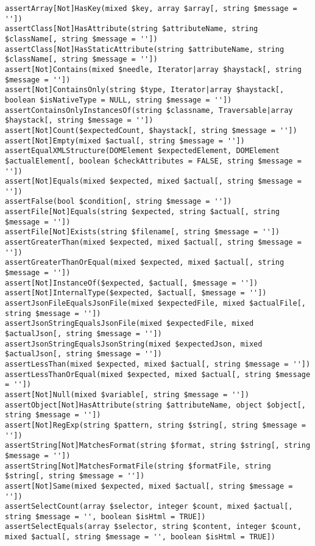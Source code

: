 \documentclass[a4paper,twoside,landscape]{scrartcl}
\begin{document}
\footnotesize
\begin{verbatim}
assertArray[Not]HasKey(mixed $key, array $array[, string $message = ''])
assertClass[Not]HasAttribute(string $attributeName, string $className[, string $message = ''])
assertClass[Not]HasStaticAttribute(string $attributeName, string $className[, string $message = ''])
assert[Not]Contains(mixed $needle, Iterator|array $haystack[, string $message = ''])
assert[Not]ContainsOnly(string $type, Iterator|array $haystack[, boolean $isNativeType = NULL, string $message = ''])
assertContainsOnlyInstancesOf(string $classname, Traversable|array $haystack[, string $message = ''])
assert[Not]Count($expectedCount, $haystack[, string $message = ''])
assert[Not]Empty(mixed $actual[, string $message = ''])
assertEqualXMLStructure(DOMElement $expectedElement, DOMElement $actualElement[, boolean $checkAttributes = FALSE, string $message = ''])
assert[Not]Equals(mixed $expected, mixed $actual[, string $message = ''])
assertFalse(bool $condition[, string $message = ''])
assertFile[Not]Equals(string $expected, string $actual[, string $message = ''])
assertFile[Not]Exists(string $filename[, string $message = ''])
assertGreaterThan(mixed $expected, mixed $actual[, string $message = ''])
assertGreaterThanOrEqual(mixed $expected, mixed $actual[, string $message = ''])
assert[Not]InstanceOf($expected, $actual[, $message = ''])
assert[Not]InternalType($expected, $actual[, $message = ''])
assertJsonFileEqualsJsonFile(mixed $expectedFile, mixed $actualFile[, string $message = ''])
assertJsonStringEqualsJsonFile(mixed $expectedFile, mixed $actualJson[, string $message = ''])
assertJsonStringEqualsJsonString(mixed $expectedJson, mixed $actualJson[, string $message = ''])
assertLessThan(mixed $expected, mixed $actual[, string $message = ''])
assertLessThanOrEqual(mixed $expected, mixed $actual[, string $message = ''])
assert[Not]Null(mixed $variable[, string $message = ''])
assertObject[Not]HasAttribute(string $attributeName, object $object[, string $message = ''])
assert[Not]RegExp(string $pattern, string $string[, string $message = ''])
assertString[Not]MatchesFormat(string $format, string $string[, string $message = ''])
assertString[Not]MatchesFormatFile(string $formatFile, string $string[, string $message = ''])
assert[Not]Same(mixed $expected, mixed $actual[, string $message = ''])
assertSelectCount(array $selector, integer $count, mixed $actual[, string $message = '', boolean $isHtml = TRUE])
assertSelectEquals(array $selector, string $content, integer $count, mixed $actual[, string $message = '', boolean $isHtml = TRUE])

\end{verbatim}
\end{document}
